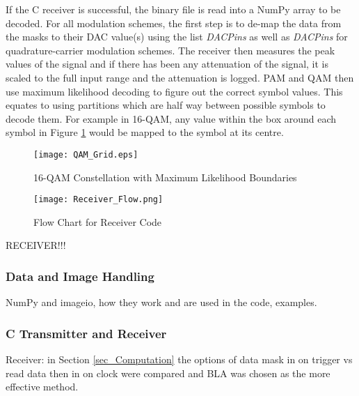 \documentclass[../main.tex]{subfiles}
\begin{document}
If the C receiver is successful, the binary file is read into a NumPy array to be decoded.
For all modulation schemes, the first step is to de-map the data from the masks to their DAC value(s) using the list \textit{DAC\textunderscore Pins} as well as \textit{DAC\textunderscore Pins} for quadrature-carrier modulation schemes.
The receiver then measures the peak values of the signal and if there has been any attenuation of the signal, it is scaled to the full input range and the attenuation is logged.
PAM and QAM then use maximum likelihood decoding to figure out the correct symbol values.
This equates to using partitions which are half way between possible symbols to decode them.
For example in 16-QAM, any value within the box around each symbol in Figure \ref{fig_QAM ML Decoding} would be mapped to the symbol at its centre.\\

\begin{figure}[ht]
	\centering
	\texttt{[image: QAM\_Grid.eps]}
	\caption{16-QAM Constellation with Maximum Likelihood Boundaries}
	\label{fig_QAM ML Decoding}
\end{figure}

\begin{figure}[ht]
	\centering
	\texttt{[image: Receiver\_Flow.png]}
	\caption{Flow Chart for Receiver Code}
	\label{fig_Receiver_Flow}
\end{figure}

RECEIVER!!!



\subsubsection{Data and Image Handling}

NumPy and imageio, how they work and are used in the code, examples.\\

\subsubsection{C Transmitter and Receiver} \label{sec_C Transmitter and Receiver}

Receiver: in Section \ref{sec_Computation} the options of data mask in on trigger vs read data then in on clock were compared and BLA was chosen as the more effective method.
\end{document}
